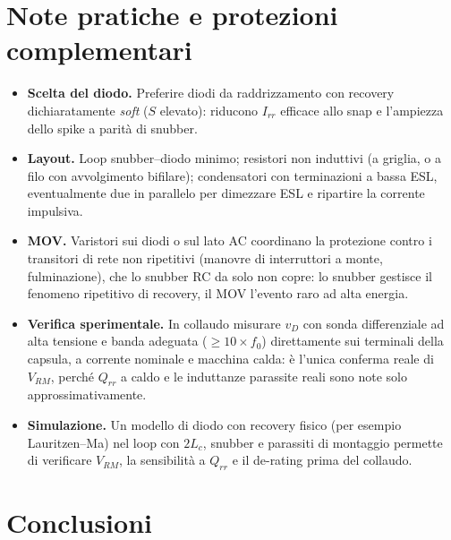 \documentclass[11pt,a4paper]{article}
\begin{document}
\section{Note pratiche e protezioni complementari}

\begin{itemize}
\item \textbf{Scelta del diodo.} Preferire diodi da raddrizzamento con
recovery dichiaratamente \emph{soft} ($S$ elevato): riducono $I_{rr}$
efficace allo snap e l'ampiezza dello spike a parit\`a di snubber.
\item \textbf{Layout.} Loop snubber--diodo minimo; resistori non
induttivi (a griglia, o a filo con avvolgimento bifilare); condensatori
con terminazioni a bassa ESL, eventualmente due in parallelo per
dimezzare ESL e ripartire la corrente impulsiva.
\item \textbf{MOV.} Varistori sui diodi o sul lato AC coordinano la
protezione contro i transitori di rete non ripetitivi (manovre di
interruttori a monte, fulminazione), che lo snubber RC da solo non
copre: lo snubber gestisce il fenomeno ripetitivo di recovery, il MOV
l'evento raro ad alta energia.
\item \textbf{Verifica sperimentale.} In collaudo misurare $v_D$ con
sonda differenziale ad alta tensione e banda adeguata ($\ge 10\times f_0$)
direttamente sui terminali della capsula, a corrente nominale e macchina
calda: \`e l'unica conferma reale di $V_{RM}$, perch\'e $Q_{rr}$ a caldo e
le induttanze parassite reali sono note solo approssimativamente.
\item \textbf{Simulazione.} Un modello di diodo con recovery fisico (per
esempio Lauritzen--Ma) nel loop con $2L_c$, snubber e parassiti di
montaggio permette di verificare $V_{RM}$, la sensibilit\`a a $Q_{rr}$ e
il de-rating prima del collaudo.
\end{itemize}

\section{Conclusioni}
\end{document}
